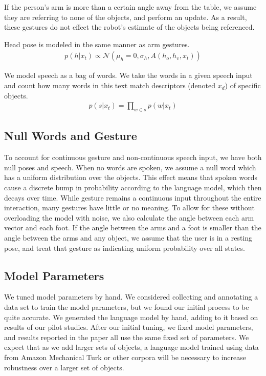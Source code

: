 \documentclass[letterpaper, 10 pt, conference]{ieeeconf}
\begin{document}
If the person's arm is more than a certain angle away from the table,
we assume they are referring to none of the objects, and perform an
update.  As a result, these gestures do not effect the robot's
estimate of the objects being referenced.

Head pose is modeled in the same manner as arm gestures.
\begin{align}
p(h | x_t) \propto \mathcal{N}(\mu_h=0, \sigma_h,A(h_o, h_v, x_t))
\end{align}


  We model speech as a bag of words. We
take the words in a given speech input and count how many words in
this text match descriptors (denoted $x_d$) of specific objects.
\begin{align}
p(s |x_t) = \displaystyle \prod_{w \in s} p(w | x_t)
\end{align}


\subsection{Null Words and Gesture}

To account for continuous gesture and non-continuous speech input, we
have both null poses and speech.  When no words are spoken, we assume
a null word which has a uniform distribution over the objects.  This
effect means that spoken words cause a discrete bump in probability
according to the language model, which then decays over time. While
gesture remains a continuous input throughout the entire interaction,
many gestures have little or no meaning. To allow for these without
overloading the model with noise, we also calculate the angle between
each arm vector and each foot. If the angle between the arms and a
foot is smaller than the angle between the arms and any object, we
assume that the user is in a resting pose, and treat that gesture as
indicating uniform probability over all states.

\subsection{Model Parameters}
We tuned model parameters by hand.  We considered collecting and
annotating a data set to train the model parameters, but we found our
initial process to be quite accurate. We generated the language model
by hand, adding to it based on results of our pilot
studies. After our initial tuning, we fixed
  model parameters, and results reported in the paper all use the same
  fixed set of parameters. We expect that as we add
larger sets of objects, a language model trained using data from
Amazon Mechanical Turk or other corpora will be necessary to increase
robustness over a larger set of objects.  
\end{document}
